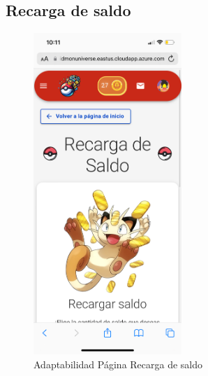 \subsection*{Recarga de saldo}
\begin{figure}[H]
    \centering
    \includegraphics[width=0.5\textwidth]{figures/adaptabilidad/recarga.png}
    \caption{Adaptabilidad Página Recarga de saldo}
    \label{fig:Adap-Recarga}
\end{figure}

